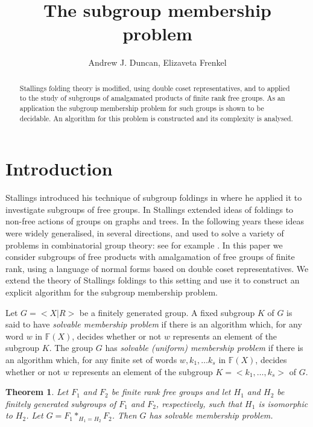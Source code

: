\documentclass[a4paper,12pt]{article}
\title{The subgroup membership problem
}
\author{Andrew J. Duncan, Elizaveta Frenkel}
\newtheorem{theorem}{Theorem}[section]
\numberwithin{equation}{section}
\numberwithin{figure}{section}
\newcommand{\FF}{\ensuremath{\mathbb{F}}}
\begin{document}
\maketitle

\begin{abstract}
Stallings folding theory is modified, using double coset representatives, and to applied
to the study of subgroups of  amalgamated
products of finite rank free groups. As an application the
 subgroup membership
problem for such groups is shown to be decidable. An algorithm for this
problem is constructed and its complexity is analysed.
 \end{abstract}



\section{Introduction}\label{se:global_intro}

Stallings introduced his technique of subgroup foldings in
\cite{stallings83} where he applied it to investigate subgroups of
free groups. In \cite{stallings88} Stallings extended ideas of
foldings to non-free actions of groups on graphs and trees. In the following
years these ideas were widely generalised, in several
directions,  and used to solve a variety of  problems in
combinatorial group theory: see for example
\cite{befe,BoWei,KM02,SilvaWeil08}.
In this paper we consider  subgroups
of free products with amalgamation of free groups of finite rank, using
a language of normal forms based on double coset representatives.  We
extend the theory  of Stallings foldings to this setting and use it to construct an
explicit algorithm for the subgroup membership problem.

Let $G = <X|R>$ be a finitely generated group.
A fixed subgroup $K$ of $G$ is said to have
\emph{solvable  membership problem} if there is an algorithm which, for
any word $w$ in $\FF(X)$, decides
whether or not $w$ represents an element of  the subgroup $K$.
The group $G$ has
\emph{solvable  (uniform) membership problem} if there is an algorithm which, for
any finite set of words $w, k_1, \ldots k_s$ in $\FF(X)$, decides
whether or not $w$ represents an element of  the subgroup $K = <k_1,
\ldots, k_s>$ of $G$.

\begin{theorem}\label{thm:membership}
Let $F_1$ and $F_2$ be finite rank free groups and let $H_1$ and $H_2$ 
be finitely generated subgroups of $F_1$ and $F_2$, respectively, such
that $H_1$ is isomorphic to $H_2$. Let $G=F_1 \ast_{H_1=H_2} F_2$. Then   
$G$ has solvable membership problem.
\end{theorem}
\end{document}
